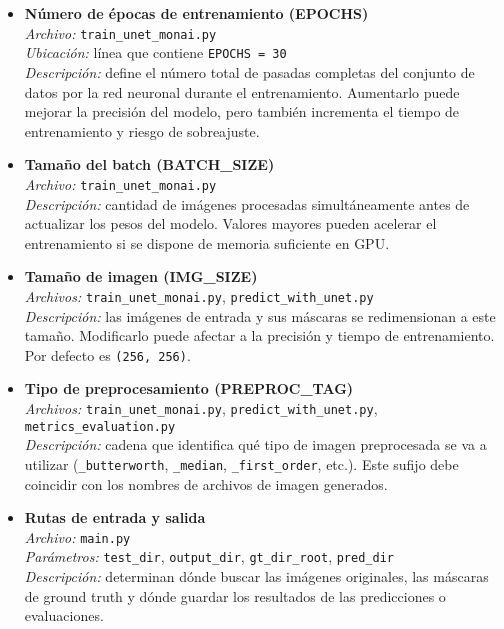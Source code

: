 \documentclass[12pt]{article}
\begin{document}
\begin{itemize}
    \item \textbf{Número de épocas de entrenamiento (EPOCHS)}\\
    \textit{Archivo:} \texttt{train\_unet\_monai.py} \\
    \textit{Ubicación:} línea que contiene \texttt{EPOCHS = 30} \\
    \textit{Descripción:} define el número total de pasadas completas del conjunto de datos por la red neuronal durante el entrenamiento. Aumentarlo puede mejorar la precisión del modelo, pero también incrementa el tiempo de entrenamiento y riesgo de sobreajuste.

    \item \textbf{Tamaño del batch (BATCH\_SIZE)}\\
    \textit{Archivo:} \texttt{train\_unet\_monai.py} \\
    \textit{Descripción:} cantidad de imágenes procesadas simultáneamente antes de actualizar los pesos del modelo. Valores mayores pueden acelerar el entrenamiento si se dispone de memoria suficiente en GPU.

    \item \textbf{Tamaño de imagen (IMG\_SIZE)}\\
    \textit{Archivos:} \texttt{train\_unet\_monai.py}, \texttt{predict\_with\_unet.py} \\
    \textit{Descripción:} las imágenes de entrada y sus máscaras se redimensionan a este tamaño. Modificarlo puede afectar a la precisión y tiempo de entrenamiento. Por defecto es \texttt{(256, 256)}.

    \item \textbf{Tipo de preprocesamiento (PREPROC\_TAG)}\\
    \textit{Archivos:} \texttt{train\_unet\_monai.py}, \texttt{predict\_with\_unet.py}, \texttt{metrics\_evaluation.py} \\
    \textit{Descripción:} cadena que identifica qué tipo de imagen preprocesada se va a utilizar (\texttt{\_butterworth}, \texttt{\_median}, \texttt{\_first\_order}, etc.). Este sufijo debe coincidir con los nombres de archivos de imagen generados.

    \item \textbf{Rutas de entrada y salida} \\
    \textit{Archivo:} \texttt{main.py} \\
    \textit{Parámetros:} \texttt{test\_dir}, \texttt{output\_dir}, \texttt{gt\_dir\_root}, \texttt{pred\_dir} \\
    \textit{Descripción:} determinan dónde buscar las imágenes originales, las máscaras de ground truth y dónde guardar los resultados de las predicciones o evaluaciones.


\end{itemize}
\end{document}
